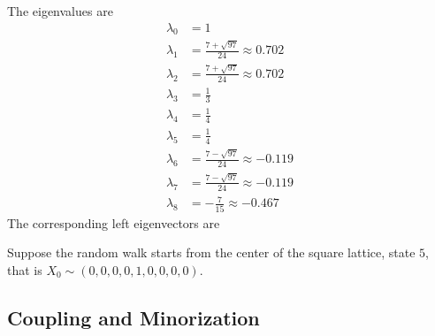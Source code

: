 \documentclass[12pt]{article}
\begin{document}
The eigenvalues are
\begin{align*}
    \lambda_0 &= 1 \\
    \lambda_1 &= \frac{7 + \sqrt{97}}{24} \approx 0.702 \\
    \lambda_2 &= \frac{7 + \sqrt{97}}{24} \approx 0.702 \\
    \lambda_3 &= \frac{1}{3} \\
    \lambda_4 &= \frac{1}{4} \\
    \lambda_5 &= \frac{1}{4} \\
    \lambda_6 &= \frac{7 - \sqrt{97}}{24} \approx -0.119 \\
    \lambda_7 &= \frac{7 - \sqrt{97}}{24} \approx -0.119 \\
    \lambda_8 &= -\frac{7}{15} \approx -0.467
\end{align*}
The corresponding left eigenvectors are

Suppose the random walk starts from the center of the square lattice,
state \( 5 \), that is \( X_0 \sim (0,0,0,0,1,0,0,0,0) \).

\subsection*{Coupling and Minorization}
\end{document}
